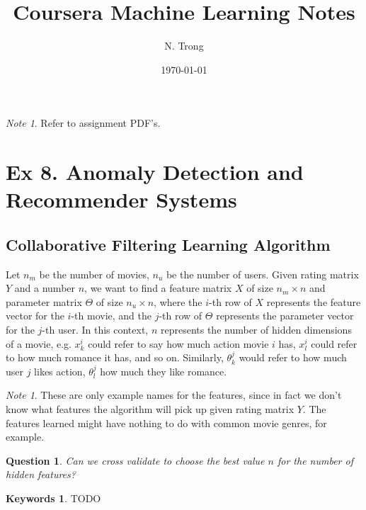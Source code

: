 \documentclass[12pt]{article}
\title{Coursera Machine Learning Notes}
\author{N. Trong}
\date{\today}                                           %
\theoremstyle{plain}
\newtheorem{quest}[thm]{Question}
\theoremstyle{definition}
\newtheorem*{keywords}{Keywords}
\theoremstyle{remark}
\newtheorem{note}[thm]{Note}
\begin{document}
\maketitle

\begin{note}
Refer to assignment PDF's.
\end{note}

\section{Ex 8. Anomaly Detection and Recommender Systems}

\subsection{Collaborative Filtering Learning Algorithm}

Let $n_m$ be the number of movies, $n_u$ be the number of users. Given rating matrix $Y$ and a number $n$, we want to find a feature matrix $X$ of size $n_m \times n$ and parameter matrix $\Theta$ of size $n_u \times n$, where the $i$-th row of $X$ represents the feature vector for the $i$-th movie, and the $j$-th row of $\Theta$ represents the parameter vector for the $j$-th user. In this context, $n$ represents the number of hidden dimensions of a movie, e.g. $x^i_k$ could refer to say how much action movie $i$ has, $x^i_l$ could refer to how much romance it has, and so on. Similarly, $\theta^j_k$ would refer to how much user $j$ likes action, $\theta^j_l$ how much they like romance.

\begin{note}
These are only example names for the features, since in fact we don't know what features the algorithm will pick up given rating matrix $Y$. The features learned might have nothing to do with common movie genres, for example.
\end{note}

\begin{quest}
Can we cross validate to choose the best value $n$ for the number of hidden features?
\end{quest}

\begin{keywords}
TODO
\end{keywords}
\end{document}
